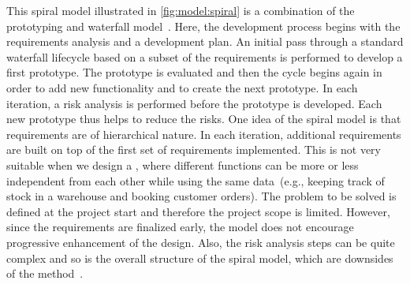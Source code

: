 This spiral model illustrated in \cref{fig:model:spiral} is a combination of the prototyping and waterfall model~\cite{PA2009SETAP,GMTM2011DDLC}.
Here, the development process begins with the requirements analysis and a development plan.
An initial pass through a standard waterfall lifecycle based on a subset of the requirements is performed to develop a first prototype.
The prototype is evaluated and then the cycle begins again in order to add new functionality and to create the next prototype.
In each iteration, a risk analysis is performed before the prototype is developed.
Each new prototype thus helps to reduce the risks.
One idea of the spiral model is that requirements are of hierarchical nature.
In each iteration, additional requirements are built on top of the first set of requirements implemented.
This is not very suitable when we design a \db, where different functions can be more or less independent from each other while using the same data~(e.g., keeping track of stock in a warehouse and booking customer orders).
The problem to be solved is defined at the project start and therefore the project scope is limited.
However, since the requirements are finalized early, the model does not encourage progressive enhancement of the design.
Also, the risk analysis steps can be quite complex and so is the overall structure of the spiral model, which are downsides of the method~\cite{S2007OOSE,GMTM2011DDLC}.

